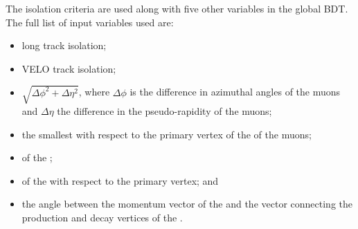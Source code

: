 The isolation criteria are used along with five other variables in the global BDT. The full list of input variables used are:
\begin{itemize}
\item long track isolation;
\item VELO track isolation;
\item $\sqrt{\Delta \phi^{2} + \Delta \eta^{2}}$, where $\Delta \phi$ is the difference in azimuthal angles of the muons and $\Delta \eta$ the difference in the pseudo-rapidity of the muons;
\item the smallest \chiIP with respect to the primary vertex of the \bsmumu of the muons;
\item \chivtx of the \bs;
\item \chiIP of the \bs with respect to the primary vertex; and
\item the angle between the momentum vector of the \bs and the vector connecting the production and decay vertices of the \bs.
\end{itemize}

